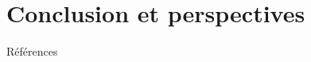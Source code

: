 \documentclass[xcolor={table,usenames,dvipsnames}]{beamer}
\begin{document}
\section[Conclusion]{Conclusion et perspectives}


%
%
%
%
%
%
%




\begin{frame}[allowframebreaks]{Références}
\printbibliography

\end{frame}
\end{document}
